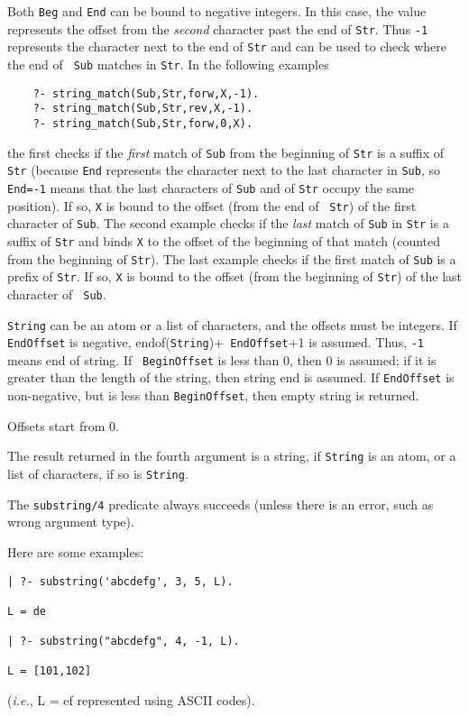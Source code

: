 \begin{description}
Both {\tt Beg} and {\tt End} can be bound to negative integers.
In this case, the value represents the offset from the \emph{second}
character past the end of {\tt Str}. Thus {\tt -1} represents the character
next to the end of {\tt Str} and can be used to check where the end of {\tt
  Sub}  matches in {\tt Str}. In the following examples
\begin{verbatim}
    ?- string_match(Sub,Str,forw,X,-1).  
    ?- string_match(Sub,Str,rev,X,-1).  
    ?- string_match(Sub,Str,forw,0,X).  
\end{verbatim}
the first checks if the \emph{first} match of {\tt Sub} from the beginning
of {\tt Str} is a suffix of {\tt Str} (because {\tt End} represents the
character next to the last character in {\tt Sub}, so {\tt End=-1} means
that the last characters of {\tt Sub} and of {\tt Str} occupy the same
position). If so, {\tt X} is bound to the offset (from the end of {\tt
  Str}) of the first character of {\tt Sub}. The second example checks if
the \emph{last} match of {\tt Sub} in {\tt Str} is a suffix of {\tt Str}
and binds {\tt X} to the offset of the beginning of that match (counted
from the beginning of {\tt Str}).  The last example checks if the first
match of {\tt Sub} is a prefix of {\tt Str}. If so, {\tt X} is bound to the
offset (from the beginning of {\tt Str}) of the last character of {\tt
  Sub}.



{\tt String} can be an atom or a list of characters, and the offsets must
be integers.  If {\tt EndOffset} is negative, endof({\tt String})+{\tt
  EndOffset}+1 is assumed. Thus, {\tt -1} means end of string.  If {\tt
  BeginOffset} is less than 0, then 0 is assumed; if it is greater than the
length of the string, then string end is assumed. If {\tt EndOffset} is
non-negative, but is less than {\tt BeginOffset}, then empty string is
returned.

Offsets start from 0.

The result returned in the fourth argument is a string, if {\tt String} is
an atom, or a list of characters, if so is {\tt String}.

The \verb|substring/4| predicate always succeeds (unless there is an error,
such as wrong argument type).

Here are some examples: 
\begin{verbatim}
| ?- substring('abcdefg', 3, 5, L).

L = de

| ?- substring("abcdefg", 4, -1, L).

L = [101,102]
\end{verbatim}
({\it i.e.}, L = ef represented using ASCII codes).

\end{description}
